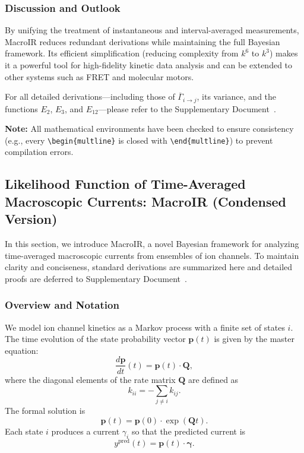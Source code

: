 \documentclass[pdflatex,sn-mathphys-num]{sn-jnl}%
\theoremstyle{thmstyleone}%
\theoremstyle{thmstyletwo}%
\theoremstyle{thmstylethree}%
\begin{document}
\subsubsection{Discussion and Outlook}
By unifying the treatment of instantaneous and interval-averaged measurements, MacroIR reduces redundant derivations while maintaining the full Bayesian framework. Its efficient simplification (reducing complexity from \(k^6\) to \(k^3\)) makes it a powerful tool for high-fidelity kinetic data analysis and can be extended to other systems such as FRET and molecular motors.

For all detailed derivations—including those of \(\overline{\Gamma}_{i\rightarrow j}\), its variance, and the functions \(E_2\), \(E_3\), and \(E_{12}\)—please refer to the Supplementary Document~\cite{supplementary}.

\textbf{Note:} All mathematical environments have been checked to ensure consistency (e.g., every \verb|\begin{multline}| is closed with \verb|\end{multline}|) to prevent compilation errors.




\subsection{Likelihood Function of Time-Averaged Macroscopic Currents: MacroIR (Condensed Version)}
In this section, we introduce MacroIR, a novel Bayesian framework for analyzing time-averaged macroscopic currents from ensembles of ion channels. To maintain clarity and conciseness, standard derivations are summarized here and detailed proofs are deferred to Supplementary Document~\cite{supplementary}.

\subsubsection{Overview and Notation}
We model ion channel kinetics as a Markov process with a finite set of states \(i\). The time evolution of the state probability vector \(\boldsymbol{p}(t)\) is given by the master equation:
\begin{equation}
	\frac{d \boldsymbol{p}}{dt}(t) = \boldsymbol{p}(t) \cdot \boldsymbol{Q},
	\label{eq:master_equation}
\end{equation}
where the diagonal elements of the rate matrix \(\boldsymbol{Q}\) are defined as
\begin{equation}
	k_{ii} = -\sum_{j \neq i} k_{ij}.
	\label{eq:Q_diagonal}
\end{equation}
The formal solution is
\begin{equation}
	\boldsymbol{p}(t) = \boldsymbol{p}(0) \cdot \exp(\boldsymbol{Q}t).
	\label{eq:master_solution}
\end{equation}
Each state \(i\) produces a current \(\gamma_i\) so that the predicted current is
\begin{equation}
	y^{\text{pred}}(t) = \boldsymbol{p}(t) \cdot \boldsymbol{\gamma}.
	\label{eq:current_prediction}
\end{equation}
\end{document}
